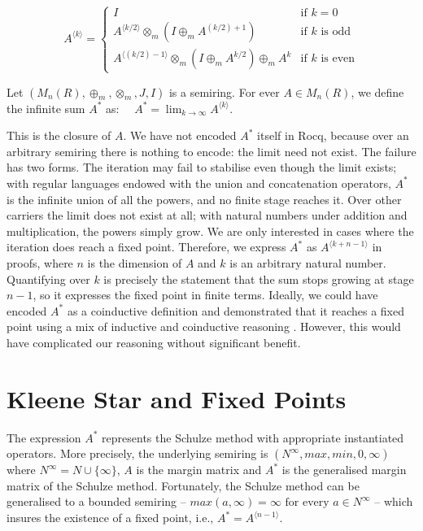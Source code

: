 \documentclass[a4paper,UKenglish,cleveref, autoref, thm-restate, anonymous]{lipics-v2021}
\begin{document}
\begin{equation}
A^{\langle k \rangle} = 
\begin{cases}
    I & \text{if } k = 0 \\
    A^{\langle k / 2 \rangle} \otimes_{m} (I \oplus_{m} A^{ (k / 2) + 1}) & \text{if } k \text{ is odd} \\
    A^{\langle (k / 2) - 1\rangle} \otimes_{m} (I \oplus_{m} A^{k / 2}) \oplus_{m} A^k & \text{if } k \text{ is even} 
\end{cases}
\label{eq:myequation}
\end{equation}
\begin{definition}\label{eq:matrix_sum_infinite}
Let   \((M_{n}(R),  \oplus_{m}, \otimes_{m}, J, I)\) is a semiring.
   For ever $A \in M_{n}(R)$, we define  the 
infinite sum $A^{*}$ as: 
$\quad A^{*} = \lim_{k\to\infty} A^{\langle k \rangle}$.
\end{definition}


This is the closure of $A$. We have not encoded $A^{*}$ itself in Rocq, because over an arbitrary semiring there is nothing to encode: the limit need not exist. The failure has two forms. The iteration may fail to stabilise even though the limit exists; with regular languages endowed with the union and concatenation operators, $A^{*}$ is the infinite union of all the powers, and no finite stage reaches it. Over other carriers the limit does not exist at all; with natural numbers under addition and multiplication, the powers simply grow. We are only interested in cases where the iteration does reach a fixed point. Therefore, we express $A^{*}$ as
$A^{\langle k + n - 1 \rangle}$ in proofs, where $n$ is the dimension of $A$ and $k$ is an arbitrary natural number. Quantifying over $k$ is precisely the statement that the sum stops growing at stage $n - 1$, so it expresses the fixed point in finite terms. Ideally, we could have encoded $A^{*}$ as a coinductive definition and demonstrated that it reaches a fixed point using a mix of inductive and coinductive reasoning \cite{Nakata_2010}. However, this would have complicated our reasoning without significant benefit.



\section{Kleene Star and Fixed Points}
\label{sec:kleene}
The expression $A^{*}$ represents the Schulze method with appropriate instantiated operators. More precisely, the underlying semiring is 
$(N^{\infty}, max, min, 0, \infty)$ where $N^{\infty} = N \cup \{\infty\}$, $A$ is the margin matrix and $A^{*}$  is the generalised margin matrix of the Schulze method.  Fortunately, the Schulze method can be generalised to a bounded semiring 
-- $max(a, \infty) = \infty \text{ for every } a \in N^{\infty}$ -- which insures the existence of 
a fixed point, i.e., $A^{*} = A^{\langle n - 1 \rangle}$. 
\end{document}
